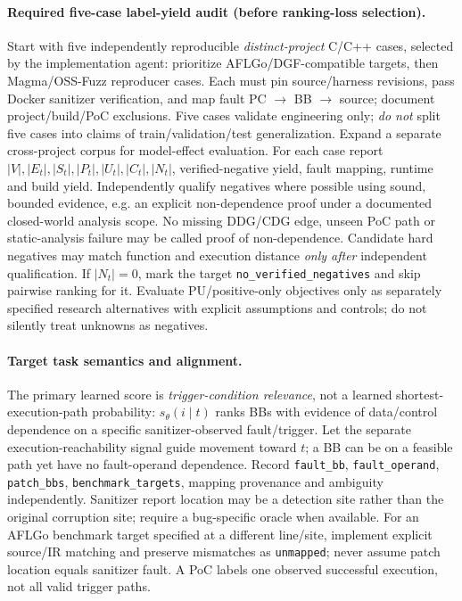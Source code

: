 \documentclass[10pt,a4paper]{article}
\begin{document}
\paragraph{Required five-case label-yield audit (before ranking-loss selection).}
Start with five independently reproducible \emph{distinct-project} C/C++ cases, selected by the implementation agent: prioritize AFLGo/DGF-compatible targets, then Magma/OSS-Fuzz reproducer cases. Each must pin source/harness revisions, pass Docker sanitizer verification, and map fault PC $\rightarrow$ BB $\rightarrow$ source; document project/build/PoC exclusions. Five cases validate engineering only; \emph{do not} split five cases into claims of train/validation/test generalization. Expand a separate cross-project corpus for model-effect evaluation. For each case report $|V|,|E_t|,|S_t|,|P_t|,|U_t|,|C_t|,|N_t|$, verified-negative yield, fault mapping, runtime and build yield. Independently qualify negatives where possible using sound, bounded evidence, e.g. an explicit non-dependence proof under a documented closed-world analysis scope. No missing DDG/CDG edge, unseen PoC path or static-analysis failure may be called proof of non-dependence. Candidate hard negatives may match function and execution distance \emph{only after} independent qualification. If $|N_t|=0$, mark the target \texttt{no\_verified\_negatives} and skip pairwise ranking for it. Evaluate PU/positive-only objectives only as separately specified research alternatives with explicit assumptions and controls; do not silently treat unknowns as negatives.

\paragraph{Target task semantics and alignment.}
The primary learned score is \emph{trigger-condition relevance}, not a learned shortest-execution-path probability: $s_\theta(i\mid t)$ ranks BBs with evidence of data/control dependence on a specific sanitizer-observed fault/trigger. Let the separate execution-reachability signal guide movement toward $t$; a BB can be on a feasible path yet have no fault-operand dependence. Record \texttt{fault\_bb}, \texttt{fault\_operand}, \texttt{patch\_bbs}, \texttt{benchmark\_targets}, mapping provenance and ambiguity independently. Sanitizer report location may be a detection site rather than the original corruption site; require a bug-specific oracle when available. For an AFLGo benchmark target specified at a different line/site, implement explicit source/IR matching and preserve mismatches as \texttt{unmapped}; never assume patch location equals sanitizer fault. A PoC labels one observed successful execution, not all valid trigger paths.
\end{document}
